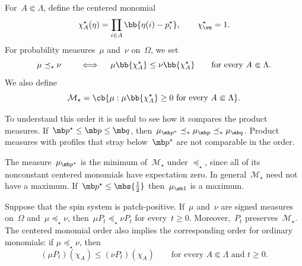 \begin{definition}
For~$A\Subset\Lambda$, define the centered monomial
\begin{equation*}
\chi_A^\star(\eta)
=
\prod_{i\in A}\bb{\eta(i)-p_i^\star},
\qquad
\chi_\vn^\star=1.
\end{equation*}
For probability measures~$\mu$ and~$\nu$ on~$\Omega$, we set
\begin{equation}
\label{eq:centered-monomial-order}
\mu\preceq_\star\nu \qquad \iff \quad \mu\bb{\chi_A^\star}
\leq
\nu\bb{\chi_A^\star}
\qquad
\text{for every }A\Subset\Lambda.
\end{equation}
We also define
\begin{equation}
\label{eq:m-star-definition-revision}
\mathcal M_\star
=
\cb{
\mu:
\mu\bb{\chi_A^\star}\geq0
\text{ for every }A\Subset\Lambda
}.
\end{equation}
\end{definition}

To understand this order it is useful to see how it compares the product measures. If~$\mb p^\star\leq\mb p\leq\mb q$, then~$\mu_{\mb p^*}\preceq_* \mu_{\mb p}\preceq_* \mu_{\mb q}$. Product measures with profiles that stray below~$\mb p^*$ are not comparable in the order.


\begin{remark}
The measure~$\mu_{\mb p^\star}$ is the minimum of~$\mathcal M_\star$ under
$\preceq_\star$, since all of its nonconstant centered monomials have
expectation zero. In general~$\mathcal M_\star$ need not have a maximum. If~$\mb p^\star\leq\mbs{\tfrac12}$ then~$\mu_{\mb 1}$ is a maximum.
\end{remark}

\begin{theorem}
\label{thm:centered-monomial-monotonicity}
Suppose that the spin system is patch-positive. If~$\mu$ and~$\nu$ are signed measures on~$\Omega$ and~$\mu\preceq_\star\nu$, then~$\mu P_t\preceq_\star\nu P_t$ for every~$t\geq 0$.
Moreover,~$P_t$ preserves~$\mathcal M_\star$. The centered monomial order also
implies the corresponding order for ordinary monomials: if
$\mu\preceq_\star\nu$, then
\begin{equation}
\label{eq:ordinary-monomial-comparison}
(\mu P_t)(\chi_A)
\leq
(\nu P_t)(\chi_A)
\qquad
\text{for every }A\Subset\Lambda\text{ and }t\geq0.
\end{equation}
\end{theorem}

